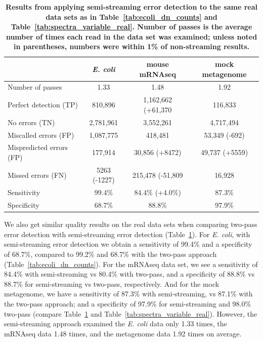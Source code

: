 \documentclass{article}
\begin{document}
\begin{table}
\begin{tabular}{|l|c||c||c|}
\hline
& {\bf \em E. coli} & {\bf mouse mRNAseq} & {\bf mock metagenome} \\
\hline
Number of passes         & 1.33      & 1.48         & 1.92 \\
\hline
Perfect detection (TP)   & 810,896   & 1,162,662 (+61,370 & 116,833  \\
No errors (TN)           & 2,781,961 & 3,552,261  & 4,717,494 \\
Miscalled errors (FP)    & 1,087,775 & 418,481    & 53,349 (-692)  \\
Mispredicted errors (FP) & 177,914   & 30,856 (+8472)    & 49,737 (+5559)  \\
Missed errors (FN)       & 5263 (-1227)     & 215,478 (-51,809  & 16,928  \\
\hline
Sensitivity            & 99.4\%      & 84.4\% (+4.0\%)     & 87.3\%  \\
Specificity            & 68.7\%      & 88.8\%     & 97.9\%  \\
\hline
\end{tabular}
\caption{{\bf Results from applying semi-streaming error detection to the same
  real data sets as in Table~\ref{tab:ecoli_dn_counts} and
  Table~\ref{tab:spectra_variable_real}.  Number of passes is the average
  number of times each read in the data set was examined; unless noted in
  parentheses, numbers were within 1\% of non-streaming results.}}
\label{tab:spectra_streaming_real}

\end{table}

We also get similar quality results on the real data sets when
comparing two-pass error detection with semi-streaming error detection
(Table~\ref{tab:spectra_streaming_real}).  For {\em E. coli}, with
semi-streaming error detection we obtain a sensitivity of 99.4\% and a
specificity of 68.7\%, compared to 99.2\% and 68.7\% with the two-pass
approach (Table~\ref{tab:ecoli_dn_counts}).  For the mRNAseq data set,
we see a sensitivity of 84.4\% with semi-streaming vs 80.4\% with two-pass,
and a specificity of 88.8\% vs 88.7\% for semi-streaming vs two-pass,
respectively.  And for the mock metagenome, we have a sensitivity of
87.3\% with semi-streaming, vs 87.1\% with the two-pass approach; and a
specificity of 97.9\% for semi-streaming and 98.0\% two-pass (compare
Table~\ref{tab:spectra_streaming_real} and
Table~\ref{tab:spectra_variable_real}).  However, the semi-streaming
approach examined the {\em E. coli} data only 1.33 times, the mRNAseq
data 1.48 times, and the metagenome data 1.92 times on average.
\end{document}
